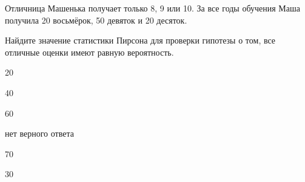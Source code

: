 
\begin{question}
Отличница Машенька получает только 8, 9 или 10. За все годы обучения
Маша получила 20 восьмёрок, 50 девяток и 20 десяток.

Найдите значение статистики Пирсона для проверки гипотезы о том, все
отличные оценки имеют равную вероятность.
\begin{answerlist}
  \item 20
  \item 40
  \item 60
  \item нет верного ответа
  \item 70
  \item 30
\end{answerlist}
\end{question}


